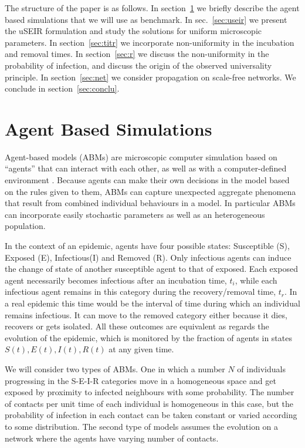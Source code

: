 \documentclass[a4paper,oneside,11pt]{article}
\begin{document}
The structure of the paper is as follows. In section~\ref{sec:ABM} we briefly describe the agent based simulations that we will use as benchmark.
In sec.~\ref{sec:useir} we present the uSEIR formulation and study the solutions for uniform microscopic parameters. In section~\ref{sec:titr} we incorporate non-uniformity in the incubation and removal times.  In section~\ref{sec:r} we discuss the non-uniformity in the probability of infection, and discuss the origin of the observed universality principle. In section~\ref{sec:net} we consider propagation on scale-free networks. We conclude in section~\ref{sec:conclu}. 

\section{Agent Based Simulations}
\label{sec:ABM}

Agent-based models (ABMs) are microscopic computer simulation based on ``agents'' that can interact with each other, as well as with a computer-defined environment \cite{Hunter2017}. Because agents can make their own decisions in the model based on the rules given to them, ABMs can capture unexpected aggregate phenomena that result from combined individual behaviours in a model. In particular ABMs can incorporate easily stochastic parameters as well as an heterogeneous population.

In the context of an epidemic, agents have four possible states: Susceptible (S), Exposed (E), Infectious(I) and Removed (R). Only infectious agents can induce the change of state of another susceptible agent to that of exposed. Each exposed agent necessarily becomes infectious after an incubation time, $t_i$, while each infectious agent remains in this category during the recovery/removal time, $t_r$. In a real epidemic this time would be the interval of time during which an individual remains infectious. It can move to the removed
category either because it dies, recovers or gets isolated. All these outcomes are equivalent as regards the evolution of the epidemic, which 
 is monitored by the fraction of agents in states $S(t), E(t), I(t), R(t)$ at any given time. 

We will consider two types of ABMs. One in which a number $N$ of individuals progressing in the S-E-I-R categories move in a homogeneous space and get exposed by proximity to infected neighbours with some probability. The number of contacts per unit time of each individual is homogeneous in this case, but the probability of infection in each contact can be taken constant or varied according to some distribution.
The second type of models assumes the evolution  on a network where the agents have varying number of contacts. 
\end{document}
